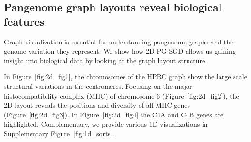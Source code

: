 \documentclass{bioinfo}
\theoremstyle{definition}
\begin{document}
    \subsection{Pangenome graph layouts reveal biological features}
	Graph visualization is essential for understanding pangenome graphs and the genome variation they represent. 
	We show how 2D PG-SGD allows us gaining insight into biological data by looking at the graph layout structure. 
			
	In Figure~\ref{fig:2d_fig1}, the chromosomes of the HPRC graph show the large scale structural variations in the centromeres.
	Focusing on the major histocompatibility complex (MHC) of chromosome 6 (Figure~\ref{fig:2d_fig2}), the 2D layout reveals the positions and diversity of all MHC genes (Figure~\ref{fig:2d_fig3}).
	In Figure~\ref{fig:2d_fig4} the C4A and C4B genes are highlighted. 
	Complementary, we provide various 1D visualizations in Supplementary Figure~\ref{fig:1d_sorts}.
\end{document}
